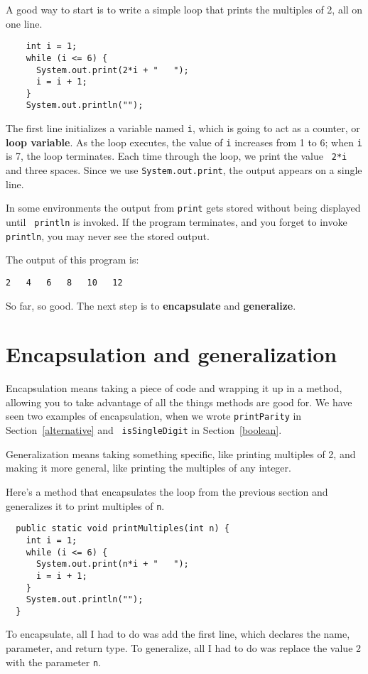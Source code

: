 \documentclass[12pt]{book}
\theoremstyle{definition}
\begin{document}
A good way to start is to write a simple loop that prints
the multiples of 2, all on one line.

\begin{lstlisting}
    int i = 1;
    while (i <= 6) {
      System.out.print(2*i + "   ");
      i = i + 1;
    }
    System.out.println("");
\end{lstlisting}
%
The first line initializes a variable named {\tt i}, which is going
to act as a counter, or {\bf loop variable}.  As the loop executes,
the value of {\tt i} increases from 1 to 6; when {\tt i} is 7, the
loop terminates.  Each time through the loop, we print the value {\tt
  2*i} and three spaces.  Since we use {\tt System.out.print}, 
the output appears on a single line.


In some environments the
output from {\tt print} gets stored without being displayed until {\tt
println} is invoked.  If the program terminates, and you forget to
invoke {\tt println}, you may never see the stored output.

The output of this program is:

\begin{lstlisting}
2   4   6   8   10   12
\end{lstlisting}
%
So far, so good.  The next step is to {\bf encapsulate} and {\bf
generalize}.


\section {Encapsulation and generalization}
\label{encapsulation}

Encapsulation means taking a piece of code and wrapping it up
in a method, allowing you to take advantage of all the things methods
are good for.  We have seen two examples of encapsulation, when we
wrote {\tt printParity} in Section~\ref{alternative} and {\tt
isSingleDigit} in Section~\ref{boolean}.

Generalization means taking something specific, like printing
multiples of 2, and making it more general, like printing the
multiples of any integer.

Here's a method that encapsulates the loop from the previous
section and generalizes it to print multiples of {\tt n}.

\begin{lstlisting}
  public static void printMultiples(int n) {
    int i = 1;
    while (i <= 6) {
      System.out.print(n*i + "   ");
      i = i + 1;
    }    
    System.out.println("");
  }
\end{lstlisting}
%
To encapsulate, all I had to do was add the first line,
which declares the name, parameter,
and return type.  To generalize, all I had to do was replace
the value 2 with the parameter {\tt n}.
\end{document}
